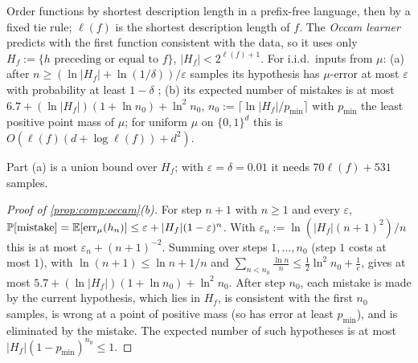 \begin{proposition}\label{prop:comp:occam}
Order functions by shortest description length in a prefix-free language, then by a fixed tie rule; $\ell(f)$ is the shortest description length of $f$. The \emph{Occam learner} predicts with the first function consistent with the data, so it uses only $H_f:=\{h\text{ preceding or equal to }f\}$, $|H_f|<2^{\ell(f)+1}$. For i.i.d.\ inputs from $\mu$: (a) after $n\ge(\ln|H_f|+\ln(1/\delta))/\varepsilon$ samples its hypothesis has $\mu$-error at most $\varepsilon$ with probability at least $1-\delta$ \citep{blumer1987occam}; (b) its expected number of mistakes is at most $6.7+(\ln|H_f|)(1+\ln n_0)+\ln^2n_0$, $n_0:=\lceil\ln|H_f|/p_{\min}\rceil$ with $p_{\min}$ the least positive point mass of $\mu$; for uniform $\mu$ on $\{0,1\}^d$ this is $O(\ell(f)(d+\log\ell(f))+d^2)$.
\end{proposition}

Part (a) is a union bound over $H_f$; with $\varepsilon=\delta=0.01$ it needs $70\ell(f)+531$ samples.

\begin{proof}[Proof of \cref{prop:comp:occam}(b)]
For step $n+1$ with $n\ge1$ and every $\varepsilon$, $\mathbb{P}[\text{mistake}]=\mathbb{E}[\mathrm{err}_\mu(h_n)]\le\varepsilon+|H_f|(1-\varepsilon)^n$. With $\varepsilon_n:=\ln(|H_f|(n+1)^2)/n$ this is at most $\varepsilon_n+(n+1)^{-2}$. Summing over steps $1,\dots,n_0$ (step $1$ costs at most $1$), with $\ln(n+1)\le\ln n+1/n$ and $\sum_{n<n_0}\frac{\ln n}n\le\frac12\ln^2n_0+\frac1e$, gives at most $5.7+(\ln|H_f|)(1+\ln n_0)+\ln^2n_0$. After step $n_0$, each mistake is made by the current hypothesis, which lies in $H_f$, is consistent with the first $n_0$ samples, is wrong at a point of positive mass (so has error at least $p_{\min}$), and is eliminated by the mistake. The expected number of such hypotheses is at most $|H_f|(1-p_{\min})^{n_0}\le1$.
\end{proof}

